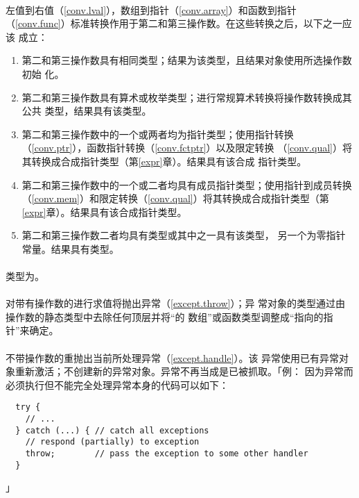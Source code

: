 \paragraph{}
左值到右值（\ref{conv.lval}），数组到指针（\ref{conv.array}）和函数到指针
（\ref{conv.func}）标准转换作用于第二和第三操作数。在这些转换之后，以下之一应该
成立：
\begin{enumerate}
  \item{第二和第三操作数具有相同类型；结果为该类型，且结果对象使用所选操作数初始
    化。}
  \item{第二和第三操作数具有算术或枚举类型；进行常规算术转换将操作数转换成其公共
    类型，结果具有该类型。}
  \item{第二和第三操作数中的一个或两者均为指针类型；使用指针转换
    （\ref{conv.ptr}），函数指针转换（\ref{conv.fctptr}）以及限定转换
    （\ref{conv.qual}）将其转换成合成指针类型（第\ref{expr}章）。结果具有该合成
    指针类型。}
  \item{第二和第三操作数中的一个或二者均具有成员指针类型；使用指针到成员转换
    （\ref{conv.mem}）和限定转换（\ref{conv.qual}）将其转换成合成指针类型（第
    \ref{expr}章）。结果具有该合成指针类型。}
  \item{第二和第三操作数二者均具有类型或其中之一具有该类型，
    另一个为零指针常量。结果具有类型。}
\end{enumerate}


\paragraph{}
类型为。

\paragraph{}
对带有操作数的进行求值将抛出异常（\ref{except.throw}）；异
常对象的类型通过由操作数的静态类型中去除任何顶层并将``的
数组''或函数类型调整成``指向的指针''来确定。

\paragraph{}
不带操作数的重抛出当前所处理异常（\ref{except.handle}）。该
异常使用已有异常对象重新激活；不创建新的异常对象。异常不再当成是已被抓取。「例：
因为异常而必须执行但不能完全处理异常本身的代码可以如下：
\begin{lstlisting}
  try {
    // ...
  } catch (...) { // catch all exceptions
    // respond (partially) to exception
    throw;        // pass the exception to some other handler
  }
\end{lstlisting}」

